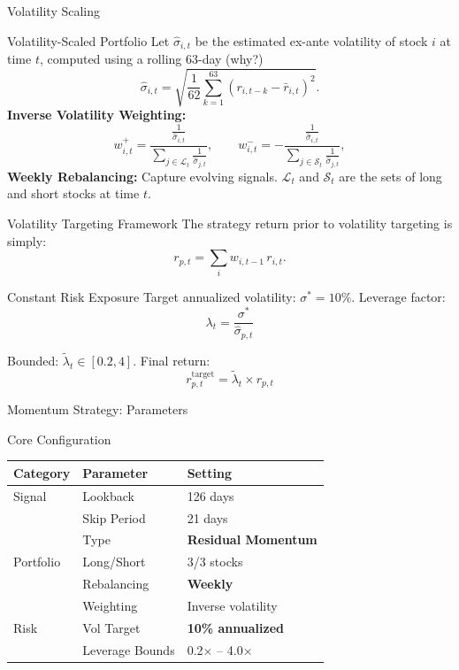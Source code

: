 \documentclass[12pt, aspectratio=43]{beamer}
\begin{document}
	\begin{frame}{Volatility Scaling}
		\vspace{-5mm}
		\small
		\begin{block}{Volatility-Scaled Portfolio}
			Let $\hat{\sigma}_{i,t}$ be the estimated ex-ante volatility of stock $i$ at time $t$, computed using a rolling 63-day (why?) 
			\[
			\hat{\sigma}_{i,t} = 
			\sqrt{\frac{1}{62}\sum_{k=1}^{63} 
				\left( r_{i,t-k} - \bar{r}_{i,t} \right)^2 }.
			\]
			\textbf{Inverse Volatility Weighting:}
			\[
			w_{i,t}^{+} = \frac{\frac{1}{\hat{\sigma}_{i,t}}}
			{\sum_{j\in\mathcal{L}_t} \frac{1}{\hat{\sigma}_{j,t}}},
			\qquad
			w_{i,t}^{-} = -
			\frac{\frac{1}{\hat{\sigma}_{i,t}}}
			{\sum_{j\in\mathcal{S}_t} \frac{1}{\hat{\sigma}_{j,t}}},
			\]
			\textbf{Weekly Rebalancing:} Capture evolving signals. $\mathcal{L}_t$ and $\mathcal{S}_t$ are the sets of long and short stocks at time $t$.
		\end{block}
		
	\end{frame}
	
	\begin{frame}{Volatility Targeting Framework}
		\small
		The strategy return prior to volatility targeting is simply:
		\[
		r_{p,t} = \sum_{i} w_{i,t-1}\, r_{i,t}.
		\]
		\vspace{-3mm}
		\begin{block}{Constant Risk Exposure}
			Target annualized volatility: $\sigma^* = 10\%$. Leverage factor:
			\[
			\lambda_t = \frac{\sigma^*}{\hat{\sigma}_{p,t}}
			\]
			
			Bounded: $\tilde{\lambda}_t \in [0.2, 4]$. Final return:
			\[
			r_{p,t}^{\text{target}} = \tilde{\lambda}_t \times r_{p,t}
			\]
		\end{block}
	\end{frame}
	
		\begin{frame}{Momentum Strategy: Parameters}
			\vspace{2mm}
		\centering
		\begin{block}{Core Configuration}
			\begin{tabular}{lll}
				Category & Parameter & Setting \\
				\midrule
				Signal & Lookback & 126 days \\
				& Skip Period & 21 days \\
				& Type & \textbf{Residual Momentum} \\
				\midrule
				Portfolio & Long/Short & 3/3 stocks \\
				& Rebalancing & \textbf{Weekly} \\
				& Weighting & Inverse volatility \\
				\midrule
				Risk & Vol Target & \textbf{10\% annualized} \\
				& Leverage Bounds & 0.2× – 4.0× \\
				\bottomrule
			\end{tabular}
		\end{block}
	\end{frame}
	
\end{document}
